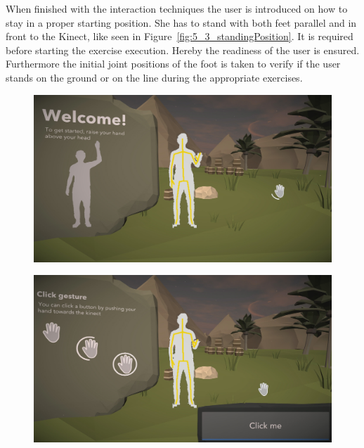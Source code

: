 When finished with the interaction techniques the user is introduced on how to stay in a proper starting position. She has to stand with both feet parallel and in front to the Kinect, like seen in Figure~\ref{fig:5_3_standingPosition}. It is required before starting the exercise execution. Hereby the readiness of the user is ensured. Furthermore the initial joint positions of the foot is taken to verify if the user stands on the ground or on the line during the appropriate exercises.
\begin{figure}[htb]
	\centering
	\begin{minipage}[t]{0.49\linewidth}
		\centering
		\includegraphics[width=1\linewidth]{Pictures/5_Workflow/1_Welcome}
		\label{fig:5_3_welcome}
	\end{minipage}
	\hfill
	\begin{minipage}[t]{0.49\linewidth}
		\centering
		\includegraphics[width=1\linewidth]{Pictures/5_Workflow/2_TutHandPush}

\end{minipage}
\end{figure}
